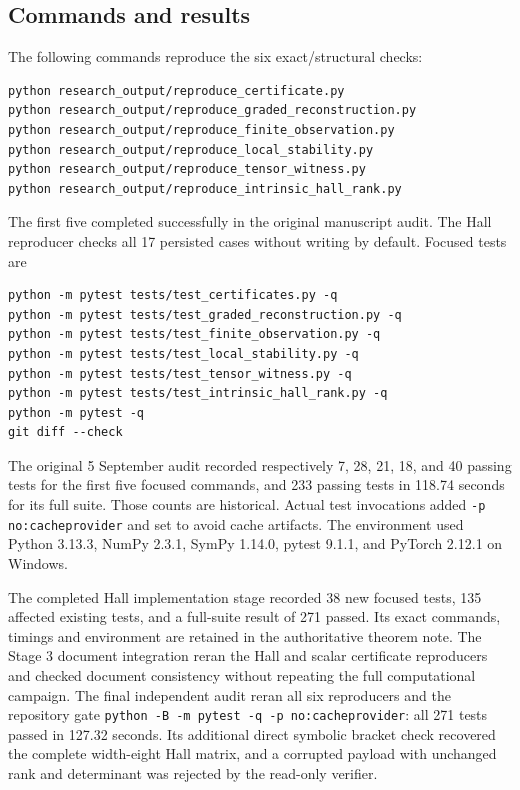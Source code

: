 \documentclass[11pt,a4paper]{article}
\numberwithin{equation}{section}
\theoremstyle{definition}
\theoremstyle{remark}
\begin{document}
\subsection{Commands and results}
The following commands reproduce the six exact/structural checks:
\begin{verbatim}
python research_output/reproduce_certificate.py
python research_output/reproduce_graded_reconstruction.py
python research_output/reproduce_finite_observation.py
python research_output/reproduce_local_stability.py
python research_output/reproduce_tensor_witness.py
python research_output/reproduce_intrinsic_hall_rank.py
\end{verbatim}
The first five completed successfully in the original manuscript audit.
The Hall reproducer checks all 17 persisted cases without writing by
default. Focused tests are
\begin{verbatim}
python -m pytest tests/test_certificates.py -q
python -m pytest tests/test_graded_reconstruction.py -q
python -m pytest tests/test_finite_observation.py -q
python -m pytest tests/test_local_stability.py -q
python -m pytest tests/test_tensor_witness.py -q
python -m pytest tests/test_intrinsic_hall_rank.py -q
python -m pytest -q
git diff --check
\end{verbatim}
The original 5 September audit recorded respectively 7, 28, 21, 18,
and 40 passing tests for the first five focused commands, and 233
passing tests in 118.74 seconds for its full suite. Those counts are
historical. Actual test
invocations added \texttt{-p no:cacheprovider} and set
 to avoid cache artifacts. The environment
used Python 3.13.3, NumPy 2.3.1, SymPy 1.14.0, pytest 9.1.1, and
PyTorch 2.12.1 on Windows.

The completed Hall implementation stage recorded 38 new focused tests,
135 affected existing tests, and a full-suite result of 271 passed.
Its exact commands, timings and environment are retained in the
authoritative theorem note. The Stage 3 document integration reran
the Hall and scalar certificate reproducers and checked document
consistency without repeating the full computational campaign.
The final independent audit reran all six reproducers and the repository
gate \texttt{python -B -m pytest -q -p no:cacheprovider}: all 271 tests
passed in 127.32 seconds. Its additional direct symbolic bracket check
recovered the complete width-eight Hall matrix, and a corrupted payload
with unchanged rank and determinant was rejected by the read-only verifier.
\end{document}
